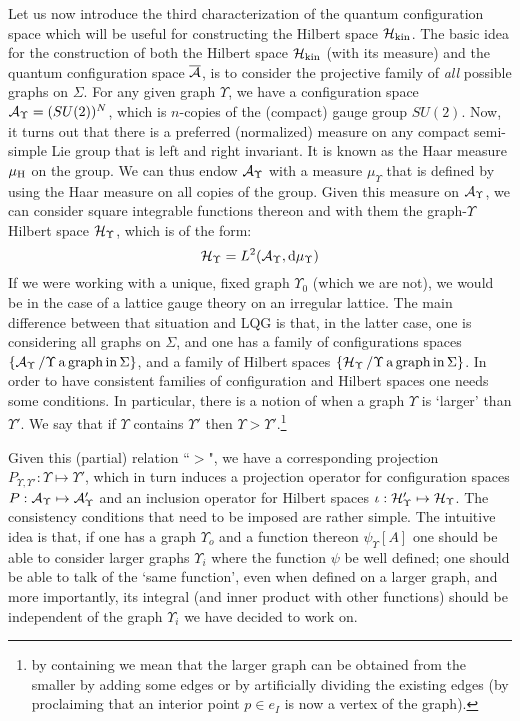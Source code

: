 \documentclass[aps,prd,tightenlines,showpacs,nofootinbib,preprint]{revtex4}
\def\be{\begin{equation}}
\def\ee{\end{equation}}
\def\d{{\rm d}}
\def\bar{\overline}
\begin{document}
 Let us now introduce the third
characterization of the quantum configuration space which will be
useful for constructing the Hilbert space ${\cal H}_{\rm kin}$.
The basic idea for the construction of both the Hilbert space
${\cal H}_{\rm kin}$ (with its measure) and the quantum
configuration space $\bar{\cal A}$, is to consider the projective
family of {\it all} possible graphs on $\Sigma$. For any given
graph $\Upsilon$, we have a configuration space ${\cal
A}_\Upsilon=(SU(2))^N$, which is $n$-copies of the (compact) gauge
group $SU(2)$. Now, it turns out that there is a preferred
(normalized) measure on any compact semi-simple Lie group that is
left and right invariant. It is known as the Haar measure
$\mu_{\rm H}$ on the group. We can thus endow ${\cal A}_\Upsilon$
with a measure $\mu_\Upsilon$ that is defined by using the Haar
measure on all copies of the group. Given this measure on ${\cal
A}_\Upsilon$, we can consider square integrable functions thereon
and with them the graph-$\Upsilon$ Hilbert space ${\cal
H}_\Upsilon$, which is of the form:
%
\be
 {\cal H}_\Upsilon=L^2({\cal A}_\Upsilon,\d\mu_\Upsilon)
\ee
%
If we were working with a unique, fixed graph $\Upsilon_0$ (which
we are not), we would be in the case of a lattice gauge theory on
an irregular lattice. The main difference between that situation
and LQG is that, in the latter case, one is considering all graphs
on $\Sigma$, and one has a family of configurations spaces $\{
{\cal A}_\Upsilon \,/ \Upsilon \,{\rm a\,graph\,in\,} \Sigma\}$,
and a family of Hilbert spaces $\{ {\cal H}_\Upsilon \,/ \Upsilon
\,{\rm a\,graph\,in\,} \Sigma\}$. In order to have  consistent
families of configuration  and Hilbert spaces one needs some
conditions. In particular, there is a notion of when a graph
$\Upsilon$ is `larger' than $\Upsilon'$. We say that if $\Upsilon$
contains $\Upsilon'$ then $\Upsilon > \Upsilon'$.\footnote{by
containing we mean that the larger graph can be obtained from the
smaller by adding some edges or by artificially dividing the
existing edges (by proclaiming that an interior point $p\in e_I$
is now a vertex of the graph).}

Given this (partial) relation ``$>$", we have a corresponding
projection $P_{\Upsilon,\Upsilon'}:\Upsilon\mapsto\Upsilon'$,
which in turn induces a projection operator for configuration
spaces $P:{\cal A}_\Upsilon\mapsto {\cal A}_\Upsilon'$ and an
inclusion operator for Hilbert spaces $\iota:{\cal
H}_\Upsilon'\mapsto {\cal H}_\Upsilon$. The consistency conditions
that need to be imposed are rather simple. The intuitive idea is
that, if one has a graph $\Upsilon_o$ and a function thereon
$\psi_\Upsilon[A]$ one should be able to consider larger graphs
$\Upsilon_i$ where the function $\psi$ be well defined; one should
be able to talk of the `same function', even when defined on a
larger graph, and more importantly, its integral (and inner
product with other functions) should be independent of the graph
$\Upsilon_i$ we have decided to work on.
\end{document}
